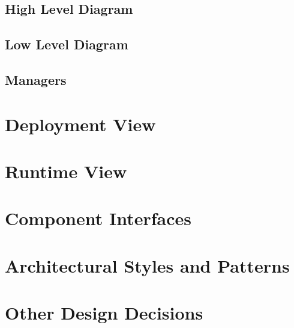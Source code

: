\subsection{High Level Diagram}
\subsection{Low Level Diagram}
\subsection{Managers}
\section{Deployment View}
\section{Runtime View}
\section{Component Interfaces}
\section{Architectural Styles and Patterns}
\section{Other Design Decisions}
